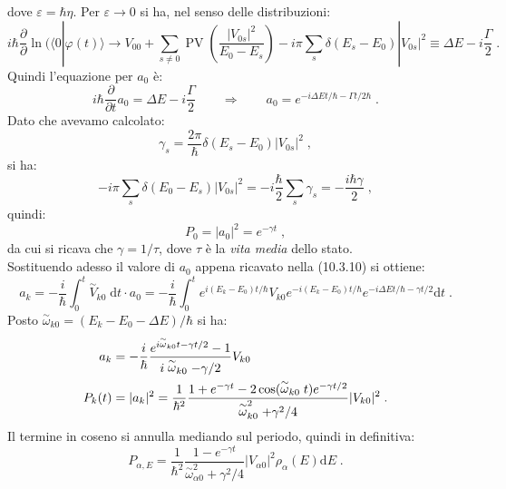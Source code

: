 \documentclass[10pt,a4paper]{report}
\theoremstyle{definition}
\numberwithin{equation}{section}
\newcommand{\diff}[1][]{\mathrm{d}#1}
\newcommand{\bra}{\langle}
\newcommand{\ket}{\rangle}
\begin{document}
dove $\varepsilon=\hbar\eta$. Per $\varepsilon\to 0$ si ha, nel senso delle distribuzioni:
\begin{equation}
i\hbar\frac{\partial}{\partial}\ln(\bra 0|\varphi(t)\ket\to V_{00}+\sum_{s\ne 0}\operatorname{PV}\left(\frac{|V_{0s}|^2}{E_0-E_s}\right)-i\pi\sum_s \delta(E_s-E_0)|V_{0s}|^2\equiv \Delta E-i\frac{\Gamma}{2}\;.
\end{equation}
Quindi l'equazione per $a_0$ è:
\begin{equation}
i\hbar\frac{\partial}{\partial t}a_0=\Delta E -i\frac{\Gamma}{2}\qquad \Longrightarrow \qquad a_0=e^{-i\Delta Et/\hbar-\Gamma t/2\hbar}\;.
\end{equation}
Dato che avevamo calcolato:
\begin{equation*}
\gamma_s=\frac{2\pi}{\hbar}\delta(E_s-E_0)|V_{0s}|^2\;,
\end{equation*}
si ha:
\begin{equation}
-i\pi\sum_s\delta(E_0-E_s)|V_{0s}|^2=-i\frac{\hbar}{2}\sum_s\gamma_s=-\frac{i\hbar \gamma}{2}\;,
\end{equation}
quindi:
\begin{equation}
P_0=|a_0|^2=e^{-\gamma t}\;,
\end{equation}
da cui si ricava che $\gamma=1/\tau$, dove $\tau$ è la \textit{vita media} dello stato.\\
Sostituendo adesso il valore di $a_0$ appena ricavato nella (10.3.10) si ottiene:
\begin{equation}
a_k=-\frac{i}{\hbar}\int_0^t\stackrel{\sim}{V}_{k0}\;\diff{t}\cdot a_0=-\frac{i}{\hbar}\int_0^t e^{i(E_k-E_0)t/\hbar} V_{k0} e^{-i(E_k-E_0)t/\hbar} e^{-i\Delta Et/\hbar-\gamma t/2}\diff{t}\;.
\end{equation}
Posto $\stackrel{\sim}{\omega}_{k0}=(E_k-E_0-\Delta E)/\hbar$ si ha:
\begin{align}
a_k &= -\frac{i}{\hbar}\frac{e^{i\stackrel{\sim}{\omega}_{k0}t-\gamma t/2}-1}{i\stackrel{\sim}{\omega}_{k0}-\gamma/2}V_{k0} \notag \\
P_k(t)&= |a_k|^2=\frac{1}{\hbar^2}\frac{1+e^{-\gamma t}-2\cos(\stackrel{\sim}{\omega}_{k0}t)e^{-\gamma t/2}}{\stackrel{\sim}{\omega}_{k0}^2+\gamma^2/4}|V_{k0}|^2\;.
\end{align}
Il termine in coseno si annulla mediando sul periodo, quindi in definitiva:
\begin{equation}
P_{\alpha,E}=\frac{1}{\hbar^2}\frac{1-e^{-\gamma t}}{\stackrel{\sim}{\omega}_{\alpha 0}^2+\gamma^2/4}|V_{\alpha 0}|^2\rho_{\alpha}(E)\diff{E}\;.
\end{equation}
\end{document}
